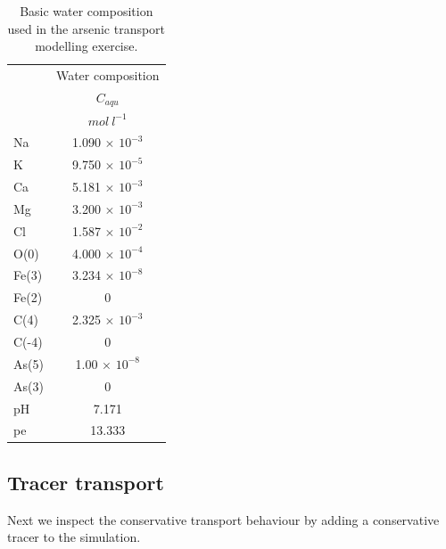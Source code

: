 \begin{table}
\caption{Basic water composition used in the arsenic transport modelling exercise.}
\begin{center}
\begin{tabular}{l c  }
\toprule
      & Water composition   \\
      & $C_{aqu}$ \\
      &    $mol\ l^{-1}$    \\ 
\midrule
Na       & 1.090 $\times$ $10^{-3}$     \\
K        & 9.750 $\times$ $10^{-5}$     \\
Ca       & 5.181 $\times$ $10^{-3}$     \\
Mg       & 3.200 $\times$ $10^{-3}$     \\
Cl       & 1.587 $\times$ $10^{-2}$     \\
O(0)     & 4.000 $\times$ $10^{-4}$     \\
Fe(3)    & 3.234 $\times$ $10^{-8}$     \\
Fe(2)    &    $0$                      \\ 
C(4)     & 2.325 $\times$ $10^{-3}$     \\ 
C(-4)    &  $0$                        \\ 
As(5)    & 1.00 $\times$ $10^{-8}$     \\
As(3)    &    $0$                      \\ 
pH    & 7.171                            \\
pe    & 13.333                            \\
\bottomrule

\end{tabular}
\label{red_dis_caqu}
\end{center}
\end{table}



\subsection[Tracer transport]{Tracer transport}

Next we inspect the conservative transport behaviour by adding a conservative tracer to the simulation.   

